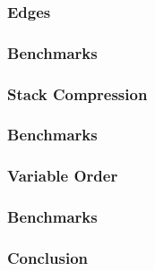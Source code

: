 \documentclass[english]{beamer}
\begin{document}
\begin{frame}
  \frametitle{Edges}
\end{frame}

\begin{frame}
  \frametitle{Benchmarks}
\end{frame}

\begin{frame}
  \frametitle{Stack Compression}
\end{frame}

\begin{frame}
  \frametitle{Benchmarks}
\end{frame}

\begin{frame}
  \frametitle{Variable Order}
\end{frame}

\begin{frame}
  \frametitle{Benchmarks}
\end{frame}

\begin{frame}
  \frametitle{Conclusion}
\end{frame}

\begin{frame}[allowframebreaks]
  
  
\end{frame}
\end{document}
